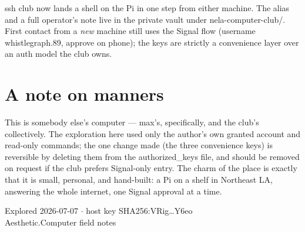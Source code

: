 \documentclass[10pt,letterpaper,twocolumn]{article}
\newcommand{\code}[1]{{\ttfamily\small\colorbox{codebg}{#1}}}
\newcommand{\fp}[1]{{\ttfamily\small\color{acdark}#1}}
\begin{document}
\code{ssh club} now lands a shell on the Pi in one step from either machine. The
alias and a full operator's note live in the private vault under
\fp{nela-computer-club/}. First contact from a \emph{new} machine still uses
the Signal flow (username \fp{whistlegraph.89}, approve on phone); the keys are
strictly a convenience layer over an auth model the club owns.

\section{A note on manners}

This is somebody else's computer --- \fp{max}'s, specifically, and the club's
collectively. The exploration here used only the author's own granted account and
read-only commands; the one change made (the three convenience keys) is reversible
by deleting them from the \fp{authorized\_keys} file, and should be removed on
request if the club prefers Signal-only entry. The charm of the place is exactly
that it is small, personal, and hand-built: a Pi on a shelf in Northeast LA,
answering the whole internet, one Signal approval at a time.

\vspace{1em}
\begin{center}
{\footnotesize\color{acgray}
Explored 2026-07-07 $\cdot$ host key SHA256:VRig\ldots Y6eo\\
Aesthetic.Computer field notes}
\end{center}
\end{document}
